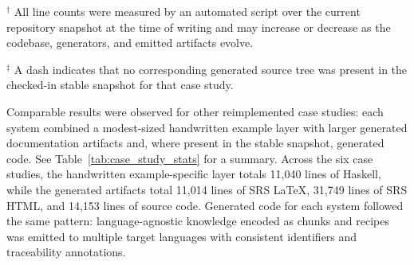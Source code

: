 \begin{table}[h]
\centering
\caption{Snapshot statistics for Drasil case study reimplementations at the time of writing}
\label{tab:case_study_stats}
\footnotesize
{}
\begin{flushleft}
\footnotesize
$^\dagger$ All line counts were measured by an automated script over the
current repository snapshot at the time of writing and may increase or
decrease as the codebase, generators, and emitted artifacts evolve.

$^\ddagger$ A dash indicates that no
corresponding generated source tree was present in the checked-in stable
snapshot for that case study.
\end{flushleft}
\end{table}

Comparable results were observed for other reimplemented case studies:
each system combined a modest-sized handwritten example layer with larger
generated documentation artifacts and, where present in the stable snapshot,
generated code. See Table~\ref{tab:case_study_stats} for a summary. Across
the six case studies, the handwritten example-specific layer totals 11,040
lines of Haskell, while the generated artifacts total 11,014 lines of SRS
\LaTeX{}, 31,749 lines of SRS HTML, and 14,153 lines of source code.
Generated code for each system followed the same pattern: language-agnostic
knowledge encoded as chunks and recipes was emitted to multiple target
languages with consistent identifiers and traceability annotations.

